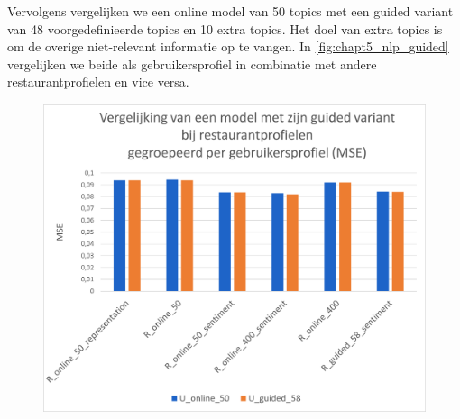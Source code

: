 Vervolgens vergelijken we een online model van 50 topics met een guided variant van 48 voorgedefinieerde topics en 10 extra topics. Het doel van extra topics is om de overige niet-relevant informatie op te vangen. In \autoref{fig:chapt5_nlp_guided} vergelijken we beide als gebruikersprofiel in combinatie met andere restaurantprofielen en vice versa. \\

\begin{figure}[H]

        \centering
        \parbox[b]{0.6\textwidth}{\includegraphics[width=\linewidth]{fig/chapt5/NLP/nlp_comparison_guided_gebruiker.png}}\quad
        \parbox[b]{0.37\textwidth}{
        \label{fig:chapt5_nlp_guided_user}}
        \\[.5cm]


\end{figure}
